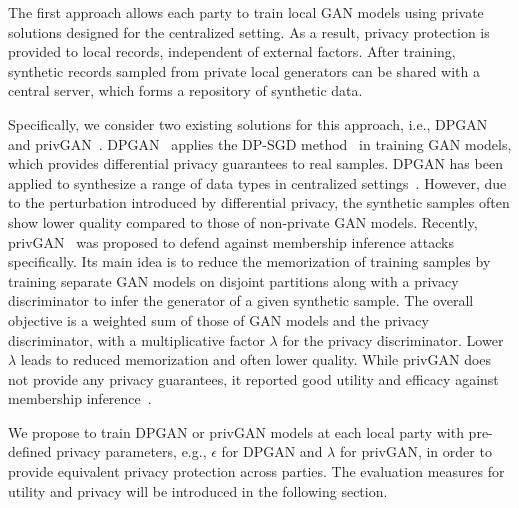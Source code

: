 \documentclass[conference]{IEEEtran}
\begin{document}
The first approach allows each party to train local GAN models using private solutions designed for the centralized setting. As a result, privacy protection is provided to local records, independent of external factors. After training, synthetic records sampled from private local generators can be shared with a central server, which forms a repository of synthetic data. 






Specifically, we consider two existing solutions for this approach, i.e., DPGAN~\cite{DPGANXie2018} and privGAN~\cite{PrivGAN2019}.  DPGAN~\cite{DPGANXie2018} applies the DP-SGD method~\cite{DPSGD2016Abadi} in training GAN models, which provides differential privacy guarantees to real samples. %
DPGAN has been applied to synthesize a range of data types in centralized settings~\cite{fan2020survey}. However, due to the perturbation introduced by differential privacy, the synthetic samples often show lower quality compared to those of non-private GAN models. 
Recently, privGAN~\cite{PrivGAN2019} was proposed to defend against membership inference attacks specifically. Its main idea is to reduce the memorization of training samples by training separate GAN models on disjoint partitions along with a privacy discriminator to infer the generator of a given synthetic sample. The overall objective is a weighted sum of those of GAN models and the privacy discriminator, with a multiplicative factor $\lambda$ for the privacy discriminator. Lower $\lambda$ leads to reduced memorization and often lower quality. While privGAN does not provide any privacy guarantees, it reported good utility and efficacy against membership inference~\cite{PrivGAN2019}.

We propose to train DPGAN or privGAN models at each local party with pre-defined privacy parameters, e.g., $\epsilon$ for DPGAN and $\lambda$ for privGAN, in order to provide equivalent privacy protection across parties.  The evaluation measures for utility and privacy will be introduced in the following section. 
\end{document}
